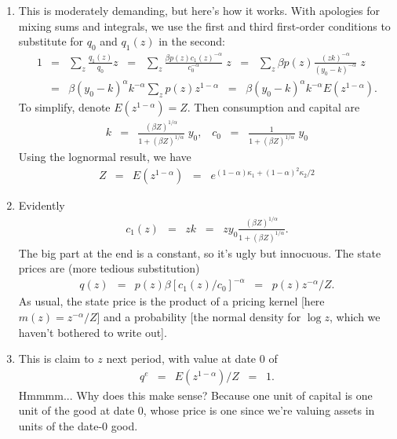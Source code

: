 \documentclass[11pt]{article}
\begin{document}
\begin{enumerate}
\begin{enumerate}
\item This is moderately demanding, but here's how it works.
With apologies for mixing sums and integrals,
we use the first and third first-order conditions to substitute
for $q_0$ and $q_1(z)$ in the second:
\begin{eqnarray*}
        1 &=& \sum_z \frac{q_1(z)}{q_0} z
            \;\;=\;\; \sum_z \frac{\beta p(z) c_1(z)^{-\alpha}}{c_0^{-\alpha}} \; z
            \;\;=\;\; \sum_z \beta p(z) \frac{(zk)^{-\alpha}}{(y_0-k)^{-\alpha}} \; z \\
          &=& \beta (y_0-k)^\alpha k^{-\alpha} \sum_z  p(z)  z^{1-\alpha}
             \;\;=\;\;  \beta (y_0-k)^\alpha k^{-\alpha} E (z^{1-\alpha} ) .
\end{eqnarray*}
To simplify, denote $ E(z^{1-\alpha}) = Z$.
Then consumption and capital are
\begin{eqnarray*}
    k &=& \frac{(\beta Z)^{1/\alpha}}{1+ (\beta Z)^{1/\alpha}} \; y_0,
        \;\;\;  c_0 \;\;=\;\; \frac{1}{1+ (\beta Z)^{1/\alpha}} \; y_0
\end{eqnarray*}
Using the lognormal result, we have
\begin{eqnarray*}
    Z &=& E(z^{1-\alpha}) \;\;=\;\; e^{(1-\alpha)\kappa_1 + (1-\alpha)^2 \kappa_2/2}
\end{eqnarray*}

\item Evidently
\begin{eqnarray*}
    c_1(z) &=& z k \;\;=\;\; z y_0 \frac{(\beta Z)^{1/\alpha}}{1+ (\beta Z)^{1/\alpha}} .
\end{eqnarray*}
The big part at the end is a constant, so it's ugly but innocuous.
The state prices are (more tedious substitution)
\begin{eqnarray*}
    q(z) &=& p(z) \beta [c_1(z)/c_0]^{-\alpha}
            \;\;=\;\; p(z) z^{-\alpha}/Z .
\end{eqnarray*}
As usual, the state price is the product of
a pricing kernel [here $m(z) = z^{-\alpha}/Z$]
and a probability [the normal density for $\log z$,
which we haven't bothered to write out].

\item
This is claim to $z$ next period,
with value at date 0 of
\begin{eqnarray*}
    q^e &=& E (z^{1-\alpha})/Z \;\;=\;\; 1.
\end{eqnarray*}
Hmmmm...
Why does this make sense?
Because one unit of capital is one unit of the good
at date 0, whose price is one since we're valuing
assets in units of the date-0 good.
\end{enumerate}


\end{enumerate}
\end{document}
